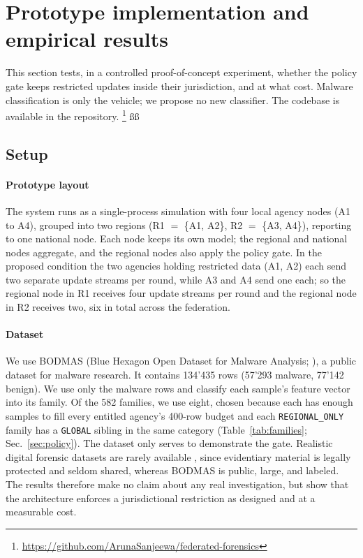 \section{Prototype implementation and empirical results}
\label{Prototype Implementation}

This section tests, in a controlled proof-of-concept experiment, whether the policy gate keeps restricted updates inside their jurisdiction, and at what cost. Malware classification is only the vehicle; we propose no new classifier. The codebase is available in the repository.
\footnote{\url{https://github.com/ArunaSanjeewa/federated-forensics}}
ßß
\subsection{Setup}
\label{sec:setup}

\paragraph{Prototype layout}



The system runs as a single-process simulation with four local
agency nodes (A1 to A4), grouped into two regions
(R1 $=$ \{A1, A2\}, R2 $=$ \{A3, A4\}), reporting to one
national node. 
Each node keeps its own model; the regional and national nodes aggregate, and the regional nodes also apply the policy gate. In the proposed
condition the two agencies holding restricted data (A1, A2) each send two separate update
streams per round, while A3 and A4 send one each;
so the regional node in R1 receives four update streams per round and the
regional node in R2 receives two, six in total across the federation. 


\paragraph{Dataset}
We use BODMAS (Blue Hexagon Open Dataset for Malware Analysis;
\citet{yang2021bodmas}), a public dataset for malware research. It contains 134'435
rows (57'293 malware, 77'142 benign). 
% 
We use only the malware rows and classify each sample's feature vector into its family. Of the 582 families, we use eight, chosen because each has enough samples to fill every entitled agency's 400-row budget and each \texttt{REGIONAL\_ONLY} family has a \texttt{GLOBAL} sibling in the same category (Table~\ref{tab:families}; Sec.~\ref{sec:policy}). 
The dataset only serves to demonstrate the gate. Realistic digital forensic datasets are rarely available \citep{breitinger2023sharing}, since evidentiary material is legally protected and seldom shared, whereas BODMAS is public, large, and labeled. The results therefore make no claim about any real investigation, but show that the architecture enforces a jurisdictional restriction as designed and at a measurable cost.

